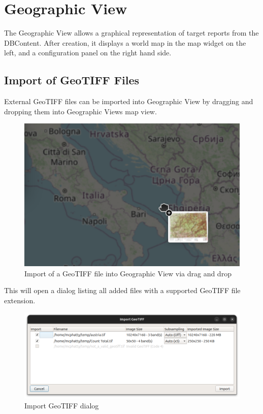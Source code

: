 \chapter{Geographic View}
\label{sec:geo_view}

The Geographic View allows a graphical representation of target reports from the DBContent. After creation, it displays a world map in the map widget on the left, and a configuration panel on the right hand side.









\section{Import of GeoTIFF Files}

External GeoTIFF files can be imported into Geographic View by dragging and dropping them into Geographic Views map view.

\begin{figure}[H]
  \center
    \includegraphics[width=12cm]{figures/geoview_import_geotiff.png}
  \caption{Import of a GeoTIFF file into Geographic View via drag and drop}
\end{figure}


This will open a dialog listing all added files with a supported GeoTIFF file extension.

\begin{figure}[H]
  \center
    \includegraphics[width=12cm]{figures/geoview_import_geotiff_dialog.png}
  \caption{Import GeoTIFF dialog}
\end{figure}

